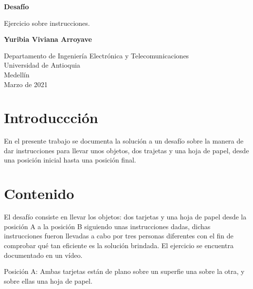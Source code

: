 ﻿\documentclass{article}
\begin{document}
\begin{titlepage}
    \begin{center}
        \vspace*{1cm}
            
        \Huge
        \textbf{Desafío}
            
        \vspace{0.5cm}
        \LARGE
        Ejercicio sobre instrucciones.
            
        \vspace{1.5cm}
            
        \textbf{Yuribia Viviana Arroyave}
            
        \vfill
            
        \vspace{0.8cm}
            
        \Large
        Departamento de Ingeniería Electrónica y Telecomunicaciones\\
        Universidad de Antioquia\\
        Medellín\\
        Marzo de 2021
            
    \end{center}
\end{titlepage}

\tableofcontents
\newpage
\section{Introduccción}\label{intro}
En el presente trabajo se documenta la solución a un desafío sobre la manera de dar instrucciones para llevar unos  objetos, dos trajetas y una hoja de papel, desde una posición inicial hasta una posición final.

\section{Contenido} \label{contenido}
El desafío consiste en llevar los objetos: dos tarjetas y una hoja de papel desde la posición A a la posición B siguiendo unas instrucciones dadas, dichas instrucciones fueron llevadas a cabo por tres personas diferentes con el fin de comprobar qué tan eficiente es la solución brindada. El ejercicio se encuentra documentado en un vídeo.
\vspace{0.8cm}

Posición A: Ambas tarjetas están de plano sobre un superfie una sobre la otra, y sobre ellas una hoja de papel.
\end{document}
